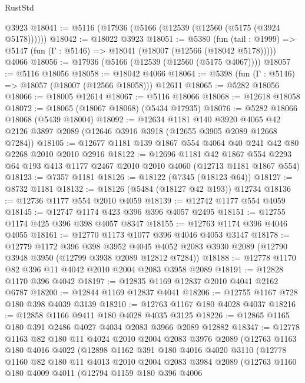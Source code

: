 \begin{lexlean}{RustStd}
\begin{coremodule}
{\begin{coremodule}
{{{{{{{{{{{{{{{{{{{{{{{{{{{{{{{    @3923
@18041 := @5116 (@17936 (@5166 (@12539 (@12560 (@5175 (@3924 @5178))))))
@18042 := @18022 @3923
@18051 := @5380
    (fun (tail : @1999) => @5147 (fun (Γ : @5146) => @18041 (@18007 (@12566 (@18042 @5178)))))
    @4066
@18056 := @17936 (@5166 (@12539 (@12560 (@5175 @4067))))
@18057 := @5116 @18056
@18058 := @18042 @4066
@18064 := @5398 (fun (Γ : @5146) => @18057 (@18007 (@12566 @18058))) @12611
@18065 := @5282 @18056
@18066 := @18005 @12614
@18067 := @5116 @18066
@18068 := @12618 @18058
@18072 := @18065 (@18067 @18068) (@5434 @17935)
@18076 := @5282 @18066 @18068 (@5439 @18004)
@18092 := @12634
    @1181
    @140
    @3920
    @4065
    @42
    @2126
    @3897
    @2089
    (@12646 @3916 @3918 (@12655 @3905 @2089 @12668 @7284))
@18105 := @12677 @1181 @139 @1867 @554 @4064 @40 @241 @42 @80 @2268 @2010 @2010 @2916
@18122 := @12696
    @1181
    @42
    @1867
    @554
    @2293
    @64
    @193
    @413
    @1177
    @2467
    @2010
    @2010
    @4060
    (@12713 @1181 @1867 @554)
@18123 := @7357 @1181
@18126 := @18122 (@7345 (@18123 @64))
@18127 := @8732 @1181
@18132 := @18126 (@5484 (@18127 @42 @193)) @12734
@18136 := @12736 @1177 @554 @2010 @4059
@18139 := @12742 @1177 @554 @4059
@18145 := @12747 @1174 @423 @396 @396 @4057 @2495
@18151 := @12755 @1174 @425 @396 @398 @4057 @8347
@18155 := @12763 @1174 @396 @4046 @4055
@18161 := @12770 @1173 @1077 @396 @4046 @4053 @3147
@18178 := @12779
    @1172
    @396
    @398
    @3952
    @4045
    @4052
    @2083
    @3930
    @2089
    (@12790 @3948 @3950 (@12799 @3938 @2089 @12812 @7284))
@18188 := @12778 @1170 @82 @396 @11 @4042 @2010 @2004 @2083 @3958 @2089
@18191 := @12828 @1170 @396 @4042
@18197 := @12835 @1169 @12837 @2010 @4041 @2162 @6787
@18200 := @12844 @1169 @12837 @4041
@18206 := @12755 @1167 @728 @180 @398 @4039 @3139
@18210 := @12763 @1167 @180 @4028 @4037
@18216 := @12858 @1166 @9411 @180 @4028 @4035 @3125
@18226 := @12865 @1165 @180 @391 @2486 @4027 @4034 @2083 @3966 @2089 @12882
@18347 := @12778
    @1163
    @82
    @180
    @11
    @4024
    @2010
    @2004
    @2083
    @3976
    @2089
    (@12763
      @1163
      @180
      @4016
      @4022
      (@12898
        @1162
        @391
        @180
        @4016
        @4020
        @3110
        (@12778
          @1160
          @82
          @180
          @11
          @4013
          @2010
          @2004
          @2083
          @3984
          @2089
          (@12763
            @1160
            @180
            @4009
            @4011
            (@12794
              @1159
              @180
              @396
              @4006
}}}}}}}}}}}}}}}}}}}}}}}}}}}}}}}
\end{coremodule}}
\end{coremodule}
\end{lexlean}
